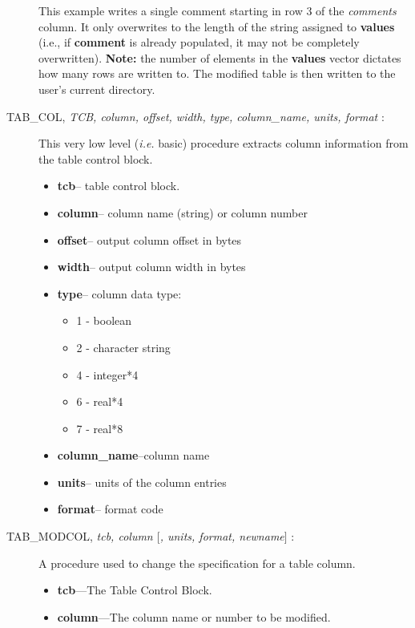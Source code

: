 \begin{description}
\noindent
This example writes a single comment starting in row 3 of the {\it comments}
 column.  It only overwrites to the length of the string assigned to 
{\bf values} (i.e., if {\bf comment} is already populated, it may not be 
completely overwritten).  {\bf Note:} the number of elements in the 
{\bf values} vector dictates how many rows are written to. The modified
table is then written to the user's current directory.
%
\item [TAB\_COL, {\it TCB, column, offset, width, type, column\_name, 
units, format} :]

This 
very low level ({\it i.e.} basic) procedure extracts column
information from the table control block. 

\begin{itemize}
\item	{\bf tcb}-- table control block.
\item	{\bf column}-- column name (string) or column number
\item	{\bf offset}-- output column offset in bytes
\item	{\bf width}-- output column width in bytes
\item	{\bf type}-- column data type:
\begin{itemize}
\item		1 - boolean
\item		2 - character string
\item		4 - integer*4
\item		6 - real*4
\item		7 - real*8
\end{itemize}
\item	{\bf column\_name}--column name
\item	{\bf units}-- units of the column entries
\item	{\bf format}-- format code
\end{itemize}
%
\item [TAB\_MODCOL, {\it tcb, column $[$, units, format, newname$]$} : ]  
A procedure used to change the specification for a table column.

\begin{itemize}

\item {\bf tcb}---The Table Control Block.

\item {\bf column}---The column name or number to be modified.


\end{itemize}
\end{description}
